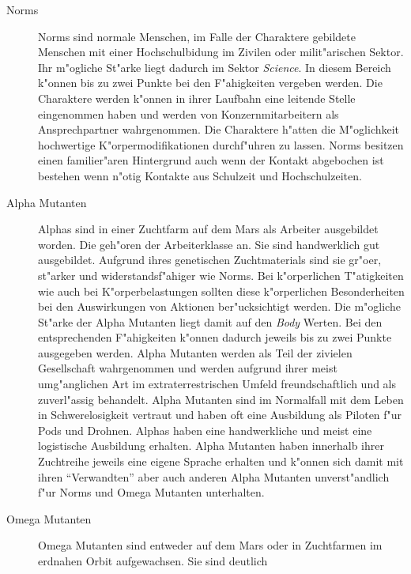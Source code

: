 \begin{description}
    \item[Norms] Norms sind normale Menschen, im Falle der Charaktere gebildete Menschen mit einer Hochschulbidung im Zivilen oder 
        milit"arischen Sektor. Ihr m"ogliche St"arke liegt dadurch im Sektor \emph{Science}. In diesem Bereich k"onnen bis zu zwei Punkte bei den F"ahigkeiten vergeben werden. Die Charaktere werden k"onnen in ihrer Laufbahn eine leitende Stelle eingenommen haben und werden von Konzernmitarbeitern als Ansprechpartner wahrgenommen. Die Charaktere h"atten die M"oglichkeit hochwertige K"orpermodifikationen durchf"uhren zu lassen. Norms besitzen einen familier"aren Hintergrund auch wenn der Kontakt abgebochen ist bestehen wenn n"otig Kontakte aus Schulzeit und Hochschulzeiten.
    \item[Alpha Mutanten] Alphas sind in einer Zuchtfarm auf dem Mars als Arbeiter ausgebildet worden. Die geh"oren der
        Arbeiterklasse an. Sie sind handwerklich gut ausgebildet. Aufgrund ihres genetischen Zuchtmaterials sind sie gr"o\3er, st"arker und widerstandsf"ahiger wie Norms. Bei k"orperlichen T"atigkeiten wie auch bei K"orperbelastungen sollten diese k"orperlichen Besonderheiten bei den Auswirkungen von Aktionen ber"ucksichtigt werden. Die m"ogliche St"arke der Alpha Mutanten liegt damit auf den \emph{Body} Werten. Bei den entsprechenden F"ahigkeiten k"onnen dadurch jeweils bis zu zwei Punkte ausgegeben werden. Alpha Mutanten werden als Teil der zivielen Gesellschaft wahrgenommen und werden aufgrund ihrer meist umg"anglichen Art im extraterrestrischen Umfeld freundschaftlich und als zuverl"assig behandelt. Alpha Mutanten sind im Normalfall mit dem Leben in Schwerelosigkeit vertraut und haben oft eine Ausbildung als Piloten f"ur Pods und Drohnen. Alphas haben eine handwerkliche und meist eine logistische Ausbildung erhalten. Alpha Mutanten haben innerhalb ihrer Zuchtreihe jeweils eine eigene Sprache erhalten und k"onnen sich damit mit ihren "`Verwandten"' aber auch anderen Alpha Mutanten unverst"andlich f"ur Norms und Omega Mutanten unterhalten. 
    \item[Omega Mutanten] Omega Mutanten sind entweder auf dem Mars oder in Zuchtfarmen im erdnahen Orbit aufgewachsen. Sie sind deutlich   

\end{description}
